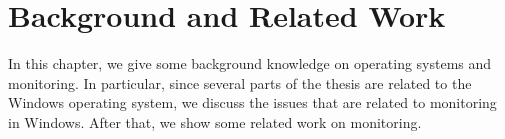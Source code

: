 \chapter{Background and Related Work}
\label{sec:bg}

In this chapter, we give some background knowledge on operating systems
and monitoring.
In particular, since several parts of the thesis are related to the
Windows operating system, we discuss the issues that are related to
monitoring in Windows.
After that, we show some related work on monitoring.
